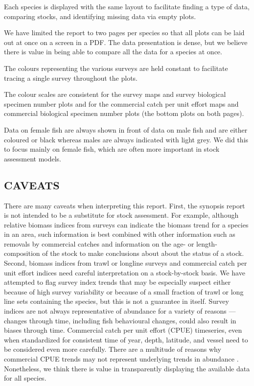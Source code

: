 \documentclass[11pt]{book}\usepackage[]{graphicx}\usepackage[]{color}
\begin{document}
\begin{resdoclist}

\item Each species is displayed with the same layout to facilitate finding
  a type of data, comparing stocks, and identifying missing data via empty
  plots.

\item We have limited the report to two pages per species so that all plots can
  be laid out at once on a screen in a PDF. The data presentation is dense, but
  we believe there is value in being able to compare all the data for a species
  at once.

\item The colours representing the various surveys are held constant to
  facilitate tracing a single survey throughout the plots.

\item The colour scales are consistent for the survey maps and survey biological
  specimen number plots and for the commercial catch per unit effort maps and
  commercial biological specimen number plots (the bottom plots on both pages).

\item Data on female fish are always shown in front of data on male fish and
  are either coloured or black whereas males are always indicated with light
  grey. We did this to focus mainly on female fish, which are often more
  important in stock assessment models.

\end{resdoclist}

\subsection{CAVEATS}

There are many caveats when interpreting this report. First, the synopsis report
is not intended to be a substitute for stock assessment. For example, although
relative biomass indices from surveys can indicate the biomass trend for
a species in an area, such information is best combined with other information
such as removals by commercial catches and information on the age- or
length-composition of the stock to make conclusions about about the status of
a stock.
Second, biomass indices from trawl or longline surveys and commercial catch per
unit effort indices need careful interpretation on a stock-by-stock basis. We
have attempted to flag survey index trends that may be especially suspect either
because of high survey variability or because of a small fraction of trawl or
long line sets containing the species, but this is not a guarantee in itself.
Survey indices are not always representative of abundance for a variety of
reasons --- changes through time, including fish behavioural changes, could also
result in biases through time. Commercial catch per unit effort (CPUE)
timeseries, even when standardized for consistent time of year, depth, latitude,
and vessel need to be considered even more carefully. There are a multitude of
reasons why commercial CPUE trends may not represent underlying trends in
abundance \citep[e.g.][]{harley2001}. Nonetheless, we think there is value in
transparently displaying the available data for all species.
\end{document}

